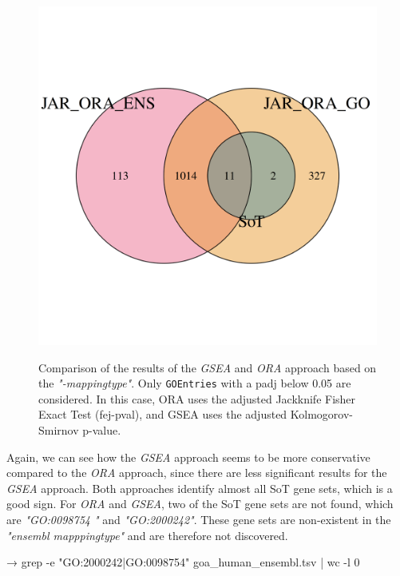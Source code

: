 \documentclass[12pt]{article}
\begin{document}
\begin{figure}[htpb]
\begin{minipage}{0.49\textwidth}
        \includegraphics[width=\textwidth]{./plots/oraOverlap.png}
        \label{fig:ora-overlap}
    \end{minipage}
    \caption{Comparison of the results of the \textit{GSEA} and \textit{ORA} approach based on 
    the \textit{"-mappingtype"}. Only \texttt{GOEntries} with a padj below 0.05 are considered.
    In this case, ORA uses the adjusted Jackknife Fisher Exact Test (fej-pval), and GSEA uses the adjusted Kolmogorov-Smirnov p-value.}
\end{figure}

Again, we can see how the \textit{GSEA} approach seems to be more conservative compared to the \textit{ORA} approach,
since there are less significant results for the \textit{GSEA} approach.
Both approaches identify almost all SoT gene sets, which is a good sign.
For \textit{ORA} and \textit{GSEA}, two of the SoT gene sets are not found, which are \textit{"GO:0098754
"} and \textit{"GO:2000242"}. These gene sets are non-existent in the \textit{"ensembl mapppingtype"} 
and are therefore not discovered.
\begin{verbatim*}
→ grep -e "GO:2000242|GO:0098754" goa_human_ensembl.tsv | wc -l
0                                                              
\end{verbatim*}
\end{document}
